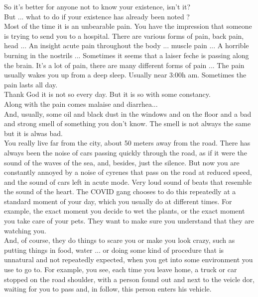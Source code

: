\documentclass[11pt]{book}
\begin{document}
\noindent So it's better for anyone not to know your existence, isn't it? \\

\noindent But ... what to do if your existence has already been noted ? \\

\noindent Most of the time it is an unbearable pain. You have the impression that someone is trying to send you to a hospital. There are various forms of pain, back pain, head ... An insight acute pain throughout the body ... muscle pain ... A horrible burning in the nostrils ... Sometimes it seems that a laiser feche is passing along the brain. It's a lot of pain, there are many different forms of pain ... The pain usually wakes you up from a deep sleep. Usually near 3:00h am. Sometimes the pain lasts all day. \\

\noindent Thank God it is not so every day. But it is so with some constancy. \\

\noindent Along with the pain comes malaise and diarrhea... \\

\noindent And, usually, some oil and black dust in the windows and on the floor and a bad and strong smell of something you don't know. The smell is not always the same but it is alwas bad. \\

\noindent You really live far from the city, about 50 meters away from the road. There has always been the noise of cars passing quickly through the road, as if it were the sound of the waves of the sea, and, besides, just the silence. But now you are constantly annoyed by a noise of cyrenes that pass on the road at reduced speed, and the sound of cars left in acute mode. Very loud sound of beats that resemble the sound of the heart. The COVID gang chooses to do this repeatedly at a standard moment of your day, which you usually do at different times. For example, the exact moment you decide to wet the plants, or the exact moment you take care of your pets. They want to make sure you understand that they are watching you. \\

\noindent And, of course, they do things to scare you or make you look crazy, such as putting things in food, water ... or doing some kind of procedure that is unnatural and not repeatedly expected, when you get into some environment you use to go to. For example, you see, each time you leave home, a truck or car stopped on the road shoulder, with a person found out and next to the veicle dor, waiting for you to pass and, in follow, this person enters his vehicle. \\
\end{document}
